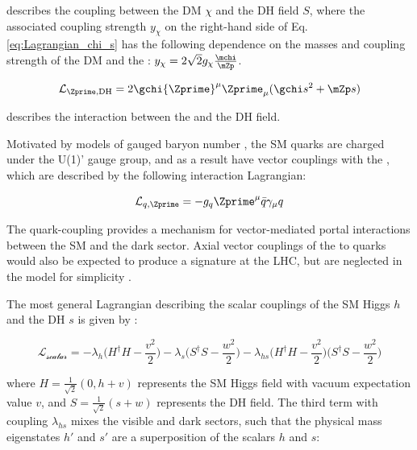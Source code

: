 \noindent describes the coupling between the DM \(\chi\) and the DH field \(S\), where the associated coupling strength \(y_\chi\) on the right-hand side of Eq. \ref{eq:Lagrangian_chi_s} has the following dependence on the masses and coupling strength of the DM and the \Zprime: \(y_\chi = 2\sqrt{2}g_\chi\frac{\mchi}{\mZp}\).

\begin{equation}
\mathcal{L}_{\Zprime, \text{DH}} = 2 \gchi {\Zprime}^{\mu} {\Zprime}_{\mu} (\gchi s^2 + \mZp s)
\end{equation}

\noindent describes the interaction between the \Zprime and the DH field.

Motivated by models of gauged baryon number \cite{Duerr2017,Duerr_2016,baryon_number}, the SM quarks are charged under the U(1)' gauge group, and as a result have vector couplings with the \Zprime, which are described by the following interaction Lagrangian:

\begin{equation}
\label{eq:quark_Zprime_coupling}
\mathcal{L}_{q, \Zprime} = -g_q{\Zprime}^\mu\bar{q}\gamma_\mu q
\end{equation}

\noindent The quark-\Zprime coupling provides a mechanism for vector-mediated portal interactions between the SM and the dark sector. Axial vector couplings of the \Zprime to quarks would also be expected to produce a signature at the LHC, but are neglected in the model for simplicity \cite{Duerr2017}. 

 The most general Lagrangian describing the scalar couplings of the SM Higgs \(h\) and the DH \(s\) is given by \cite{DH_SMHiggs_mixing_2016}:
 
 \begin{equation}
 \label{eq:scalar_lagrangian}
 \mathcal{L}_\mathcal{\text{scalar}} = -\lambda_h \Big(H^\dagger H - \frac{v^2}{2}\Big) - \lambda_s \Big(S^\dagger S - \frac{w^2}{2}\Big) - \lambda_{hs} \Big(H^\dagger H - \frac{v^2}{2}\Big) \Big(S^\dagger S - \frac{w^2}{2}\Big)
 \end{equation}
 
\noindent where \(H=\frac{1}{\sqrt{2}}(0, h+v)\) represents the SM Higgs field with vacuum expectation value \(v\), and \(S=\frac{1}{\sqrt{2}}(s+w)\) represents the DH field. The third term with coupling \(\lambda_{hs}\) mixes the visible and dark sectors, such that the physical mass eigenstates \(h'\) and \(s'\) are a superposition of the scalars \(h\) and \(s\):


